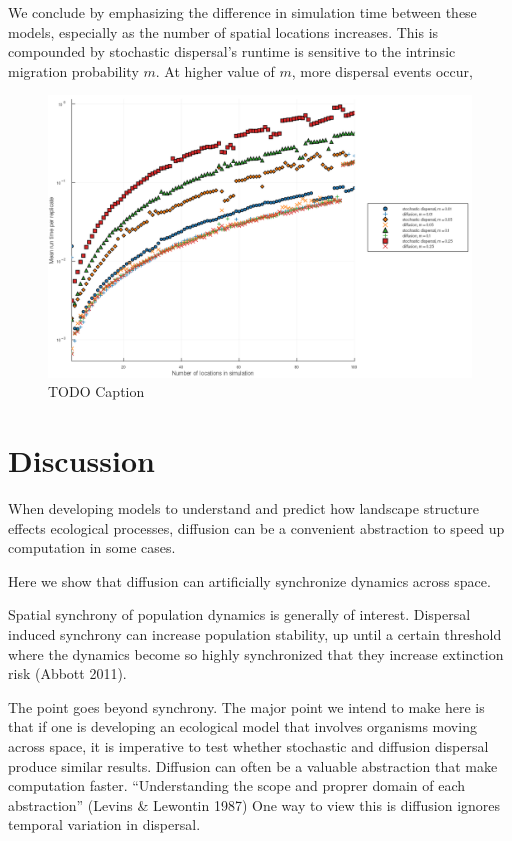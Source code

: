 \documentclass[10pt,oneside]{article}
\makeatletter
\def\maxwidth{\ifdim\Gin@nat@width>\linewidth\linewidth
\else\Gin@nat@width\fi}
\let\Oldincludegraphics\includegraphics
\renewcommand{\includegraphics}[1]{\Oldincludegraphics[width=\maxwidth]{#1}}
\makeatother
\begin{document}
We conclude by emphasizing the difference in simulation time between
these models, especially as the number of spatial locations increases.
This is compounded by stochastic dispersal's runtime is sensitive to the
intrinsic migration probability \(m\). At higher value of \(m\), more
dispersal events occur,

\begin{figure}
\hypertarget{fig:runtime}{%
\centering
\includegraphics{./figures/runtime.png}
\caption{TODO Caption}\label{fig:runtime}
}
\end{figure}

\hypertarget{discussion}{%
\section{Discussion}\label{discussion}}

When developing models to understand and predict how landscape structure
effects ecological processes, diffusion can be a convenient abstraction
to speed up computation in some cases.

Here we show that diffusion can artificially synchronize dynamics across
space.

Spatial synchrony of population dynamics is generally of interest.
Dispersal induced synchrony can increase population stability, up until
a certain threshold where the dynamics become so highly synchronized
that they increase extinction risk (Abbott 2011).

The point goes beyond synchrony. The major point we intend to make here
is that if one is developing an ecological model that involves organisms
moving across space, it is imperative to test whether stochastic and
diffusion dispersal produce similar results. Diffusion can often be a
valuable abstraction that make computation faster. ``Understanding the
scope and proprer domain of each abstraction'' (Levins \& Lewontin 1987)
One way to view this is diffusion ignores temporal variation in
dispersal.
\end{document}
